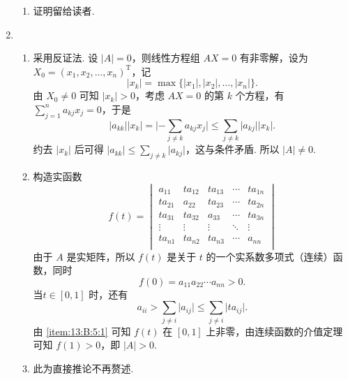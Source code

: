 \begin{enumerate}
\begin{enumerate}
              \item 证明留给读者.
          \end{enumerate}

          \item \begin{enumerate}
            \item \label{item:13:B:5:1}
                  采用反证法. 设 $\lvert A \rvert = 0$，则线性方程组 $AX = 0$ 有非零解，设为 $X_0 = (x_1, x_2, \ldots, x_n)^{\mathrm{T}}$，记
                  \[\lvert x_k \rvert = \max \{\lvert x_1 \rvert, \lvert x_2 \rvert, \ldots, \lvert x_n \rvert\}.\]
                  由 $X_0 \neq 0$ 可知 $\lvert x_k \rvert > 0$，考虑 $AX = 0$ 的第 $k$ 个方程，有 $\displaystyle\sum_{j=1}^n a_{kj}x_j = 0$，于是
                  \[\lvert a_{kk} \rvert \lvert x_k \rvert = \lvert -\displaystyle\sum_{j \neq k}a_{kj}x_j \rvert \leqslant \displaystyle\sum_{j \neq k}\lvert a_{kj} \rvert \lvert x_k \rvert.\]
                  约去 $\lvert x_k \rvert$ 后可得 $\lvert a_{kk} \rvert \leqslant \displaystyle\sum_{j \neq k} \lvert a_{kj} \rvert$，这与条件矛盾. 所以 $\lvert A \rvert \neq 0$.

            \item 构造实函数
                  \[f(t) = \begin{vmatrix}
                          a_{11}  & ta_{12} & ta_{13} & \cdots & ta_{1n} \\
                          ta_{21} & a_{22}  & ta_{23} & \cdots & ta_{2n} \\
                          ta_{31} & ta_{32} & a_{33}  & \cdots & ta_{3n} \\
                          \vdots  & \vdots  & \vdots  & \ddots & \vdots  \\
                          ta_{n1} & ta_{n2} & ta_{n3} & \cdots & a_{nn}  \\
                      \end{vmatrix}\]
                  由于 $A$ 是实矩阵，所以 $f(t)$ 是关于 $t$ 的一个实系数多项式（连续）函数，同时
                  \[f(0) = a_{11}a_{22}\cdots a_{nn} > 0.\] 当$t \in [0, 1]$ 时，还有
                  \[a_{ii} > \sum_{j \neq i} \lvert a_{ij} \rvert \leqslant \sum_{j \neq i} \lvert ta_{ij} \rvert.\]
                  由 \ref*{item:13:B:5:1} 可知 $f(t)$ 在 $[0, 1]$ 上非零，由连续函数的介值定理可知 $f(1) > 0$，即 $\lvert A \rvert > 0$.

            \item 此为直接推论不再赘述.
        \end{enumerate}
\end{enumerate}

\clearpage
